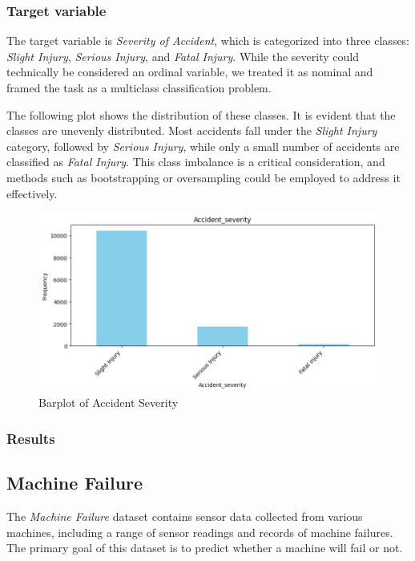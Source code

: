 \documentclass{article}
\begin{document}
\subsubsection{Target variable}
The target variable is \textit{Severity of Accident}, which is categorized into three classes: \textit{Slight Injury}, \textit{Serious Injury}, and \textit{Fatal Injury}. While the severity could technically be considered an ordinal variable, we treated it as nominal and framed the task as a multiclass classification problem.

The following plot shows the distribution of these classes. It is evident that the classes are unevenly distributed. Most accidents fall under the \textit{Slight Injury} category, followed by \textit{Serious Injury}, while only a small number of accidents are classified as \textit{Fatal Injury}. This class imbalance is a critical consideration, and methods such as bootstrapping or oversampling could be employed to address it effectively.

\begin{figure}[H]
\centering
\includegraphics[width=1\linewidth]{Accident_severity.png}
\caption{\label{fig:bar:severity} Barplot of Accident Severity}
\end{figure}



\subsubsection{Results}

\subsection{Machine Failure}
The \textit{Machine Failure} dataset contains sensor data collected from various machines, including a range of sensor readings and records of machine failures. The primary goal of this dataset is to predict whether a machine will fail or not.
\end{document}
